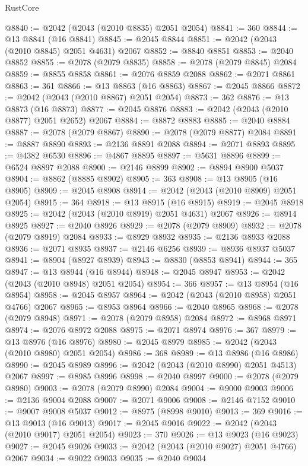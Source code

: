 \begin{lexlean}{RustCore}
\begin{coremodule}
@8840 := @2042 (@2043 (@2010 @8835) @2051 @2054)
@8841 := 360
@8844 := @13 @8841 (@16 @8841)
@8845 := @2045 @8844
@8851 := @2042 (@2043 (@2010 @8845) @2051 @4631) @2067
@8852 := @8840 @8851
@8853 := @2040 @8852
@8855 := @2078 (@2079 @8835)
@8858 := @2078 (@2079 @8845) @2084
@8859 := @8855 @8858
@8861 := @2076 @8859 @2088
@8862 := @2071 @8861
@8863 := 361
@8866 := @13 @8863 (@16 @8863)
@8867 := @2045 @8866
@8872 := @2042 (@2043 (@2010 @8867) @2051 @2054)
@8873 := 362
@8876 := @13 @8873 (@16 @8873)
@8877 := @2045 @8876
@8883 := @2042 (@2043 (@2010 @8877) @2051 @2652) @2067
@8884 := @8872 @8883
@8885 := @2040 @8884
@8887 := @2078 (@2079 @8867)
@8890 := @2078 (@2079 @8877) @2084
@8891 := @8887 @8890
@8893 := @2136 @8891 @2088
@8894 := @2071 @8893
@8895 := @4382 @6530
@8896 := @4867 @8895
@8897 := @5631 @8896
@8899 := @6524 @8897 @2088
@8900 := @2146 @8899
@8902 := @8894 @8900 @5037
@8904 := @8862 (@8885 @8902)
@8905 := 363
@8908 := @13 @8905 (@16 @8905)
@8909 := @2045 @8908
@8914 := @2042 (@2043 (@2010 @8909) @2051 @2054)
@8915 := 364
@8918 := @13 @8915 (@16 @8915)
@8919 := @2045 @8918
@8925 := @2042 (@2043 (@2010 @8919) @2051 @4631) @2067
@8926 := @8914 @8925
@8927 := @2040 @8926
@8929 := @2078 (@2079 @8909)
@8932 := @2078 (@2079 @8919) @2084
@8933 := @8929 @8932
@8935 := @2136 @8933 @2088
@8936 := @2071 @8935
@8937 := @2146 @6256
@8939 := @8936 @8937 @5037
@8941 := @8904 (@8927 @8939)
@8943 := @8830 (@8853 @8941)
@8944 := 365
@8947 := @13 @8944 (@16 @8944)
@8948 := @2045 @8947
@8953 := @2042 (@2043 (@2010 @8948) @2051 @2054)
@8954 := 366
@8957 := @13 @8954 (@16 @8954)
@8958 := @2045 @8957
@8964 := @2042 (@2043 (@2010 @8958) @2051 @4766) @2067
@8965 := @8953 @8964
@8966 := @2040 @8965
@8968 := @2078 (@2079 @8948)
@8971 := @2078 (@2079 @8958) @2084
@8972 := @8968 @8971
@8974 := @2076 @8972 @2088
@8975 := @2071 @8974
@8976 := 367
@8979 := @13 @8976 (@16 @8976)
@8980 := @2045 @8979
@8985 := @2042 (@2043 (@2010 @8980) @2051 @2054)
@8986 := 368
@8989 := @13 @8986 (@16 @8986)
@8990 := @2045 @8989
@8996 := @2042 (@2043 (@2010 @8990) @2051 @4513) @2067
@8997 := @8985 @8996
@8998 := @2040 @8997
@9000 := @2078 (@2079 @8980)
@9003 := @2078 (@2079 @8990) @2084
@9004 := @9000 @9003
@9006 := @2136 @9004 @2088
@9007 := @2071 @9006
@9008 := @2146 @7152
@9010 := @9007 @9008 @5037
@9012 := @8975 (@8998 @9010)
@9013 := 369
@9016 := @13 @9013 (@16 @9013)
@9017 := @2045 @9016
@9022 := @2042 (@2043 (@2010 @9017) @2051 @2054)
@9023 := 370
@9026 := @13 @9023 (@16 @9023)
@9027 := @2045 @9026
@9033 := @2042 (@2043 (@2010 @9027) @2051 @4766) @2067
@9034 := @9022 @9033
@9035 := @2040 @9034

\end{coremodule}
\end{lexlean}
